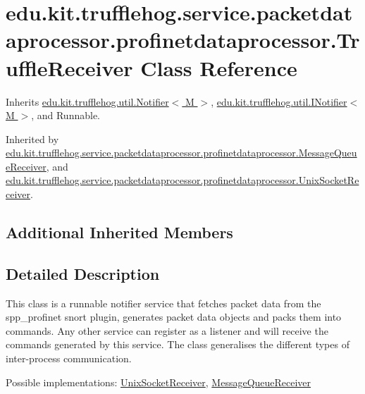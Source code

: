 \hypertarget{classedu_1_1kit_1_1trufflehog_1_1service_1_1packetdataprocessor_1_1profinetdataprocessor_1_1_truffle_receiver}{}\section{edu.\+kit.\+trufflehog.\+service.\+packetdataprocessor.\+profinetdataprocessor.\+Truffle\+Receiver Class Reference}
\label{classedu_1_1kit_1_1trufflehog_1_1service_1_1packetdataprocessor_1_1profinetdataprocessor_1_1_truffle_receiver}


Inherits \hyperlink{classedu_1_1kit_1_1trufflehog_1_1util_1_1_notifier}{edu.\+kit.\+trufflehog.\+util.\+Notifier$<$ M $>$}, \hyperlink{interfaceedu_1_1kit_1_1trufflehog_1_1util_1_1_i_notifier}{edu.\+kit.\+trufflehog.\+util.\+I\+Notifier$<$ M $>$}, and Runnable.



Inherited by \hyperlink{classedu_1_1kit_1_1trufflehog_1_1service_1_1packetdataprocessor_1_1profinetdataprocessor_1_1_message_queue_receiver}{edu.\+kit.\+trufflehog.\+service.\+packetdataprocessor.\+profinetdataprocessor.\+Message\+Queue\+Receiver}, and \hyperlink{classedu_1_1kit_1_1trufflehog_1_1service_1_1packetdataprocessor_1_1profinetdataprocessor_1_1_unix_socket_receiver}{edu.\+kit.\+trufflehog.\+service.\+packetdataprocessor.\+profinetdataprocessor.\+Unix\+Socket\+Receiver}.

\subsection*{Additional Inherited Members}


\subsection{Detailed Description}
This class is a runnable notifier service that fetches packet data from the spp\+\_\+profinet snort plugin, generates packet data objects and packs them into commands. Any other service can register as a listener and will receive the commands generated by this service. The class generalises the different types of inter-\/process communication. 

Possible implementations\+: \hyperlink{classedu_1_1kit_1_1trufflehog_1_1service_1_1packetdataprocessor_1_1profinetdataprocessor_1_1_unix_socket_receiver}{Unix\+Socket\+Receiver}, \hyperlink{classedu_1_1kit_1_1trufflehog_1_1service_1_1packetdataprocessor_1_1profinetdataprocessor_1_1_message_queue_receiver}{Message\+Queue\+Receiver} 